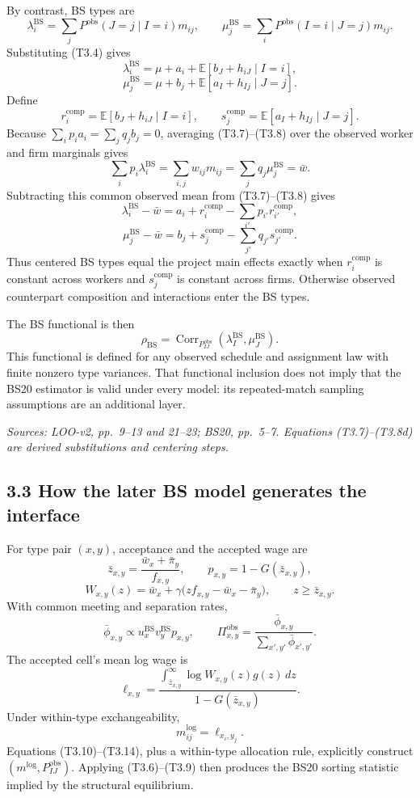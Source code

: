\documentclass[11pt]{article}
\begin{document}
By contrast, BS types are
\[
\lambda_i^{\mathrm{BS}}
=
\sum_jP^{\mathrm{obs}}(J=j\mid I=i)m_{ij},
\qquad
\mu_j^{\mathrm{BS}}
=
\sum_iP^{\mathrm{obs}}(I=i\mid J=j)m_{ij}.
\tag{T3.6}
\]
Substituting (T3.4) gives
\[
\lambda_i^{\mathrm{BS}}
=
\mu+a_i
+\mathbb E[b_J+h_{iJ}\mid I=i],
\tag{T3.7}
\]
\[
\mu_j^{\mathrm{BS}}
=
\mu+b_j
+\mathbb E[a_I+h_{Ij}\mid J=j].
\tag{T3.8}
\]
Define
\[
r_i^{\mathrm{comp}}
=\mathbb E[b_J+h_{iJ}\mid I=i],
\qquad
s_j^{\mathrm{comp}}
=\mathbb E[a_I+h_{Ij}\mid J=j].
\tag{T3.8a}
\]
Because \(\sum_i p_i a_i=\sum_jq_jb_j=0\), averaging (T3.7)--(T3.8)
over the observed worker and firm marginals gives
\[
\sum_ip_i\lambda_i^{\mathrm{BS}}
=
\sum_{i,j}w_{ij}m_{ij}
=
\sum_jq_j\mu_j^{\mathrm{BS}}
=\bar w.
\tag{T3.8b}
\]
Subtracting this common observed mean from (T3.7)--(T3.8) gives
\[
\lambda_i^{\mathrm{BS}}-\bar w
=a_i+r_i^{\mathrm{comp}}-\sum_{i'}p_{i'}r_{i'}^{\mathrm{comp}},
\tag{T3.8c}
\]
\[
\mu_j^{\mathrm{BS}}-\bar w
=b_j+s_j^{\mathrm{comp}}-\sum_{j'}q_{j'}s_{j'}^{\mathrm{comp}}.
\tag{T3.8d}
\]
Thus centered BS types equal the project main effects exactly when
\(r_i^{\mathrm{comp}}\) is constant across workers and
\(s_j^{\mathrm{comp}}\) is constant across firms.  Otherwise observed
counterpart composition and interactions enter the BS types.

The BS functional is then
\[
\rho_{\mathrm{BS}}
=
\operatorname{Corr}_{P^{\mathrm{obs}}_{IJ}}
(\lambda_I^{\mathrm{BS}},\mu_J^{\mathrm{BS}}).
\tag{T3.9}
\]
This functional is defined for any observed schedule and assignment law with
finite nonzero type variances.  That functional inclusion does not imply that
the BS20 estimator is valid under every model: its repeated-match sampling
assumptions are an additional layer.

\textit{Sources: LOO-v2, pp.\ 9--13 and 21--23; BS20, pp.\ 5--7.
Equations (T3.7)--(T3.8d) are derived substitutions and centering steps.}

\subsection{3.3 How the later BS model generates the interface}

For type pair \((x,y)\), acceptance and the accepted wage are
\[
\bar z_{x,y}
=
\frac{\bar w_x+\bar\pi_y}{f_{x,y}},
\qquad
p_{x,y}=1-G(\bar z_{x,y}),
\tag{T3.10}
\]
\[
W_{x,y}(z)
=
\bar w_x+\gamma
\bigl(zf_{x,y}-\bar w_x-\bar\pi_y\bigr),
\qquad z\geq\bar z_{x,y}.
\tag{T3.11}
\]
With common meeting and separation rates,
\[
\bar\phi_{x,y}
\propto
u_x^{\mathrm{BS}}v_y^{\mathrm{BS}}p_{x,y},
\qquad
\Pi^{\mathrm{obs}}_{x,y}
=
\frac{\bar\phi_{x,y}}{\sum_{x',y'}\bar\phi_{x',y'}}.
\tag{T3.12}
\]
The accepted cell's mean log wage is
\[
\ell_{x,y}
=
\frac{\displaystyle\int_{\bar z_{x,y}}^\infty
\log W_{x,y}(z)g(z)\,dz}
{1-G(\bar z_{x,y})}.
\tag{T3.13}
\]
Under within-type exchangeability,
\[
m^{\log}_{ij}=\ell_{x_i,y_j}.
\tag{T3.14}
\]
Equations (T3.10)--(T3.14), plus a within-type allocation rule, explicitly
construct \((m^{\log},P^{\mathrm{obs}}_{IJ})\).  Applying (T3.6)--(T3.9) then
produces the BS20 sorting statistic implied by the structural equilibrium.
\end{document}
